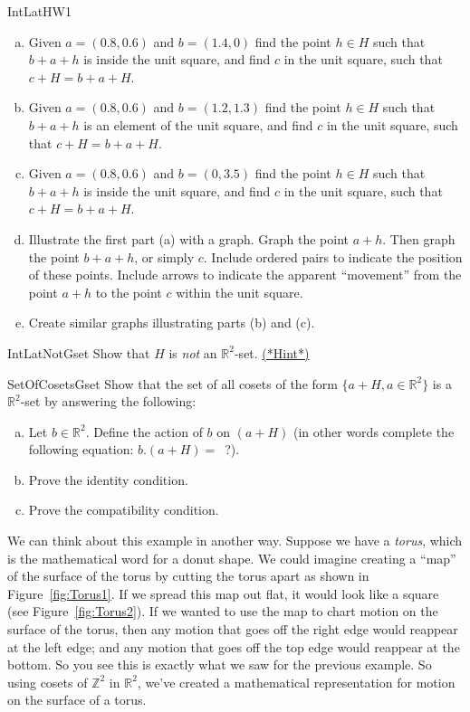 \begin{exercise}{IntLatHW1}
\begin{enumerate}[(a)]
\item Given $a=(0.8,0.6)$ and $b=(1.4,0)$ find the point $h\in H$ such that $b+a+h$ is inside the unit square, and find $c$ in the unit square, such that $c+H=b+a+H$.
\item Given $a=(0.8,0.6)$ and $b=(1.2,1.3)$ find the point $h\in H$ such that $b+a+h$ is an element of the unit square, and find $c$ in the unit square, such that $c+H=b+a+H$.
\item Given $a=(0.8,0.6)$ and $b=(0,3.5)$ find the point $h\in H$ such that $b+a+h$ is inside the unit square, and find $c$ in the unit square, such that $c+H=b+a+H$.
\item Illustrate the first part (a) with a graph.  Graph the point $a+h$.  Then graph the point $b+a+h$, or simply $c$.  Include ordered pairs to indicate the position of these points. Include arrows to indicate the apparent ``movement'' from the point $a+h$ to the point $c$ within the unit square.
\item Create similar graphs illustrating parts (b) and (c).
\end{enumerate}
\end{exercise}

\begin{exercise}{IntLatNotGset} Show that $H$ is \emph{not} an $\mathbb{R}^2$-set. \hyperref[sec:GroupActions:Hints]{(*Hint*)}
\end{exercise}

\begin{exercise}{SetOfCosetsGset} Show that the set of all cosets of the form $\{a+H, a \in \mathbb{R}^2\}$ is a $\mathbb{R}^2$-set by answering the following:
\begin{enumerate}[(a)]
\item Let $b \in \mathbb{R}^2$. Define the action of $b$ on $(a+H)$ (in other words complete the following equation: $b.(a+H)=$~?).
\item Prove the identity condition.
\item Prove the compatibility condition.
\end{enumerate}
\end{exercise}


We can think about this example in another way. Suppose we have a \emph{torus}, which is the mathematical word for a donut shape. We could imagine creating a ``map'' of the surface of the torus by cutting the torus apart as shown in Figure~\ref{fig:Torus1}. If we spread this map out flat, it would look like a square (see Figure~\ref{fig:Torus2}). If we wanted to use the map to chart motion on the surface of the torus, then any motion that goes off the right edge would reappear at the left edge; and any motion that goes off the top edge would reappear at the bottom. So you see this is exactly what we saw for the previous example. So using cosets of $\mathbb{Z}^2$ in $\mathbb{R}^2$, we've created a mathematical representation for motion on the surface of a torus.

